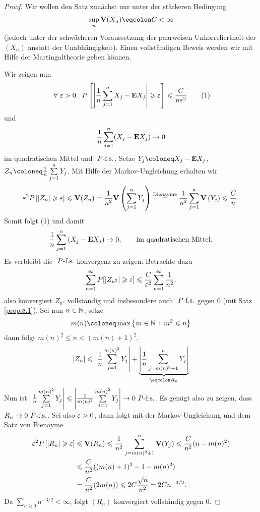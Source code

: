 \begin{proof}
Wir wollen den Satz zunächst nur unter der stärkeren Bedingung
\begin{align*}
\sup_n \V(X_n) \defr C < \infty
\end{align*}
(jedoch unter der schwächeren Voraussetzung der paarweisen Unkorreliertheit der
$(X_n)$ anstatt der Unabhängigkeit). Einen vollständigen Beweis werden wir mit
Hilfe der Martingaltheorie geben können.

Wir zeigen nun
\begin{align*}
\forall \ep > 0 : P\left[\abs{\frac{1}{n} \sum\limits_{j=1}^n X_j - \E
X_j} \ge \ep\right] \le \frac{C}{n\ep^2}\tag{1}
\end{align*}
und
\begin{align*}
\frac{1}{n}\sum\limits_{j=1}^n (X_j-\textbf{E} X_j) \to 0
\end{align*}
im quadratischen Mittel und $\ P\text{-f.s.}$. Setze $Y_j \defl X_j-\E X_j$, $Z_n \defl
\frac{1}{n}\sum\limits_{j=1}^n Y_j$. Mit Hilfe der Markov-Ungleichung erhalten
wir
\begin{align*}
\varepsilon^2 P\left[\left|Z_n\right| \geqslant \varepsilon\right] \leqslant \textbf{V}(Z_n)
= \frac{1}{n^2}\textbf{V}\left(\sum\limits_{j=1}^n Y_j\right)
\overset{\text{Bienayme}}{=} \frac{1}{n^2}\sum\limits_{j=1}^n\textbf{V}\left( Y_j\right)
\leqslant \frac{C}{n}.
\end{align*}
Somit folgt (1) und damit
\begin{align*}
\frac{1}{n}\sum\limits_{j=1}^n \left(X_j - \textbf{E} X_j\right) \to 0,\qquad
\text{im quadratischen Mittel}.
\end{align*}
Es verbleibt die $\ P\text{-f.s.}$ konvergenz zu zeigen.
Betrachte dazu
\begin{align*}
\sum\limits_{n=1}^\infty P[\left|Z_{n^2}\right|\geqslant \varepsilon] \leqslant
\frac{C}{\varepsilon^2}\sum\limits_{n=1}^\infty \frac{1}{n^2}.
\end{align*}
also konvergiert $Z_{n^2}$ vollständig und insbesondere auch $\ P\text{-f.s.}$ gegen $0$
(mit Satz \ref{prop:8.1}). Sei nun $n\in\mathbb{N}$, setze
\begin{align*}
m(n) \defl \max \setdef{m\in\N}{m^2\le n}
\end{align*}
dann folgt $m(n)^2 \le n < (m(n)+1)^2$. 
\begin{align*}
\abs{Z_n} \le \abs{\frac{1}{n}\sum\limits_{j=1}^{m(n)^2} Y_j} + 
\underbrace{\abs{\frac{1}{n} \sum\limits_{j=m(n)^2+1}^n Y_j}}_{\defr R_n}
\end{align*}
Nun ist $\left|\frac{1}{n}\sum\limits_{j=1}^{m(n)^2} Y_j\right| \leqslant
\left|\frac{1}{m(n)^2}\sum\limits_{j=1}^{m(n)^2} Y_j\right| \to 0\ P\text{-f.s.}$. Es genügt also
zu zeigen, dass $R_n\to 0\ P\text{-f.s.}$. Sei also $\varepsilon >0$, dann folgt mit der
Markov-Ungleichung und dem Satz von Bienayme
\begin{align*}
\varepsilon^2P\left[\left|R_n\right|\geqslant \varepsilon\right] &\leqslant \textbf{V}(R_n)
\leqslant \frac{1}{n^2}\sum\limits_{j=m(n)^2+1}^n \textbf{V}(Y_j)
\leqslant \frac{C}{n^2} (n-m(n)^2)\\
&\leqslant  \frac{C}{n^2} ((m(n)+1)^2-1-m(n)^2)\\
&=   \frac{C}{n^2} (2m(n)) \leqslant 2C\frac{\sqrt{n}}{n^2}
= 2C n^{-3/2}.
\end{align*}
Da $\sum_{n\ge 0}n^{-3/2}<\infty$, folgt $(R_n)$ konvergiert vollständig gegen
$0$.\qedhere
\end{proof}

